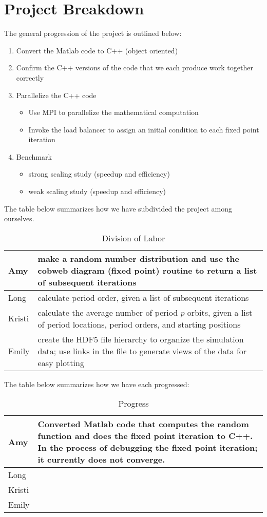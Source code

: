 \documentclass[12pt]{article}
\newcommand{\be}{\begin{enumerate}}
\newcommand{\ee}{\end{enumerate}}
\newcommand{\bi}{\begin{itemize}}
\newcommand{\ei}{\end{itemize}}
\begin{document}
\section{Project Breakdown}
The general progression of the project is outlined below:
\be
\item Convert the Matlab code to C++ (object oriented)
\item Confirm the C++ versions of the code that we each produce work
  together correctly
\item Parallelize the C++ code
\bi
\item Use MPI to parallelize the mathematical computation
\item Invoke the load balancer to assign an initial condition to each
  fixed point iteration \cite{dlb}
\ei
\item Benchmark 
\bi
\item strong scaling study (speedup and efficiency)
\item weak scaling study (speedup and efficiency)
\ei
\ee
\noindent The table below summarizes how we have subdivided the project among
ourselves. 
\begin {table}[H]
\centering
\caption{Division of Labor}
    \begin{tabular}{ |p{1cm}|p{10cm}|} 
    \hline
    Amy &  make a random number distribution and use the cobweb
    diagram (fixed point) routine to return a list of subsequent iterations\\ \hline
    Long & calculate period order, given a list of subsequent iterations  \\ \hline
    Kristi & calculate the average number of period $p$ orbits, given
    a list of period locations, period orders, and starting positions\\ \hline
    Emily  & create the HDF5 file hierarchy to organize the simulation
    data; use links in the file to generate views of the data for easy
    plotting\\ \hline
    \end{tabular}
\end{table}
\newpage
\noindent The table below summarizes how we have each progressed:
\begin {table}[H]
\centering
\caption{Progress}
    \begin{tabular}{ |p{1cm}|p{10cm}|} 
    \hline
    Amy &  Converted Matlab code that computes the random function and
    does the fixed point iteration to C++. In the process of debugging
    the fixed point iteration; it currently does not converge. \\ \hline
    Long & \\ \hline
    Kristi & \\ \hline
    Emily  & \\ \hline
    \end{tabular}
\end{table}
\end{document}
